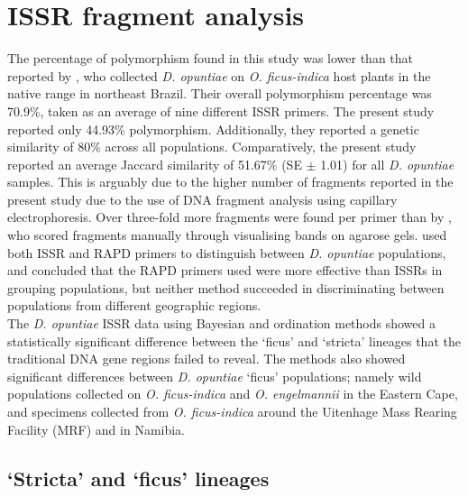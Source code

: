 \section{ISSR fragment analysis}
The percentage of polymorphism found in this study was lower than that reported by \citet{silva2013genetic}, who collected \textit{D. opuntiae} on \textit{O. ficus-indica} host plants in the native range in northeast Brazil. 
Their overall polymorphism percentage was 70.9\%, taken as an average of nine different ISSR primers. The present study reported only 44.93\% polymorphism. Additionally, they reported a genetic similarity of 80\% across all populations. Comparatively, the present study reported an average Jaccard similarity of 51.67\% (SE $\pm$ 1.01) for all \textit{D. opuntiae} samples. This is arguably due to the higher number of fragments reported in the present study due to the use of DNA fragment analysis using capillary electrophoresis. Over three-fold more fragments were found per primer than by \citet{silva2013genetic}, who scored fragments manually through visualising bands on agarose gels. 
\citet{silva2013genetic} used both ISSR and RAPD primers to distinguish between \textit{D. opuntiae} populations, and concluded that the RAPD primers used were more effective than ISSRs in grouping populations, but neither method succeeded in discriminating between populations from different geographic regions. \\
The \textit{D. opuntiae} ISSR data using Bayesian and ordination methods showed a statistically significant difference between the `ficus' and `stricta' lineages that the traditional DNA gene regions failed to reveal. The methods also showed significant differences between \textit{D. opuntiae} `ficus' populations; namely wild populations collected on \textit{O. ficus-indica} and \textit{O. engelmannii} in the Eastern Cape, and specimens collected from \textit{O. ficus-indica} around the Uitenhage Mass Rearing Facility (MRF) and in Namibia. 

\subsection{`Stricta' and `ficus' lineages}

